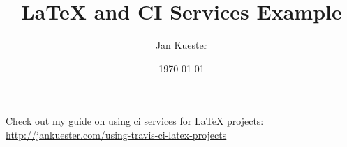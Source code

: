 \documentclass{article}
\title{LaTeX and CI Services Example}
\author{Jan Kuester}
\date{\today}
\begin{document}
\maketitle

Check out my guide on using ci services for LaTeX projects: \url{http://jankuester.com/using-travis-ci-latex-projects}
\end{document}
